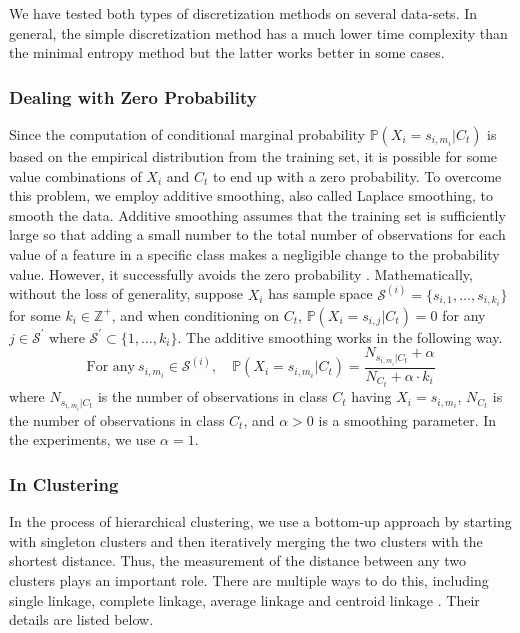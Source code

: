 \documentclass[twoside,11pt]{article}
\begin{document}
We have tested both types of discretization methods on several data-sets. In general, the simple discretization method has a much lower time complexity than the minimal entropy method but the latter works better in some cases.

\subsubsection{Dealing with Zero Probability}\label{zero_prob}
Since the computation of conditional marginal probability $\mathbb{P}(X_i=s_{i,m_i}|C_t)$ is based on the empirical distribution from the training set, it is possible for some value combinations of $X_i$ and $C_t$ to end up with a zero probability. To overcome this problem, we employ additive smoothing, also called Laplace smoothing, to smooth the data. Additive smoothing assumes that the training set is sufficiently large so that adding a small number to the total number of observations for each value of a feature in a specific class makes a negligible change to the probability value. However, it successfully avoids the zero probability \citep{han2011data}. Mathematically, without the loss of generality, suppose $X_i$ has sample space $\mathcal{S}^{(i)}=\{s_{i,1},\dots,s_{i,k_i}\}$ for some $k_i\in \mathbb{Z}^{+}$, and when conditioning on $C_t$, $\mathbb{P}(X_i=s_{i,j}|C_t)=0$ for any $j\in \mathcal{S}^{'}$ where $\mathcal{S}^{'}\subset \{1,\dots,k_i\}$. The additive smoothing works in the following way.
\begin{displaymath}
\text{For any}\ s_{i,m_i}\in \mathcal{S}^{(i)}, \quad \mathbb{P}(X_i=s_{i,m_i}|C_t)=\frac{N_{s_{i,m_i}|C_t}+\alpha}{N_{C_t}+\alpha\cdot k_i}
\end{displaymath}
where $N_{s_{i,m_i}|C_t}$ is the number of observations in class $C_t$ having $X_i=s_{i,m_i}$, $N_{C_t}$ is the number of observations in class $C_t$, and $\alpha >0$ is a smoothing parameter. In the experiments, we use $\alpha =1$.

\subsubsection{In Clustering}\label{in_clustering}
In the process of hierarchical clustering, we use a bottom-up approach by starting with singleton clusters and then iteratively merging the two clusters with the shortest distance. Thus, the measurement of the distance between any two clusters plays an important role. There are multiple ways to do this, including single linkage, complete linkage, average linkage and centroid linkage \citep{han2011data}. Their details are listed below.
\end{document}
